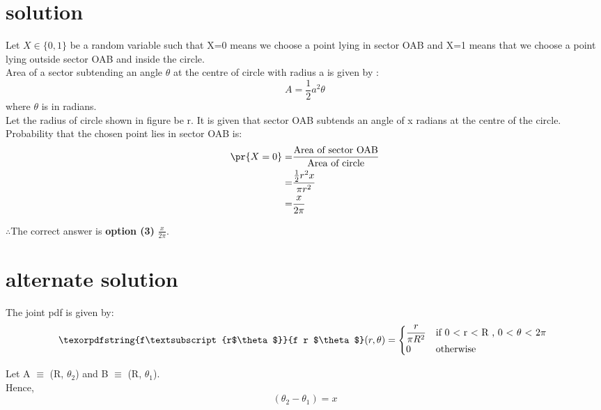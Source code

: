 \section*{\textbf{solution}}
Let $X \in \{0,1\}$ be a random variable such that X=0 means we choose a point lying in sector OAB and X=1 means that we choose a point lying outside sector OAB and inside the circle.\\

Area of a sector subtending an angle $\theta$ at the centre of circle with radius a is given by :
\begin{equation}
    A = \frac{1}{2}a^2\theta
\end{equation}
where $\theta$ is in radians.\\

Let the radius of circle shown in figure be r. It is given that  sector  OAB subtends an angle of x radians at the centre of the circle.\\

Probability that the chosen point lies in sector OAB is:
\begin{align}
    \pr{X=0} =& \frac{\text{Area of sector OAB}}{\text{Area of circle}}\\
       =& \frac{\frac{1}{2} r^2 x}{\pi r^2}\\
       =& \frac{x}{2\pi}
\end{align}

$\therefore$The correct answer is \textbf{option (3)} $\frac{x}{2\pi}$.

\section*{\textbf{alternate solution}}
The joint pdf is given by:
\begin{equation}
 \texorpdfstring{f\textsubscript{r$\theta$}}{f r $\theta$}(r,\theta)= \begin{cases}
                        \dfrac{r}{\pi R^2}  & \text{if 0 $<$ r $<$ R , 0 $<$ $\theta$ $<$ 2$\pi$ }\\
                        0  & \text{otherwise}
                        \end{cases}
\end{equation}

Let A $\equiv$ (R,  $\theta _2$) and B $\equiv$ (R,  $\theta _1$). \\
Hence,
\begin{equation}
(\theta _2 - \theta _1)= x    
\end{equation}

